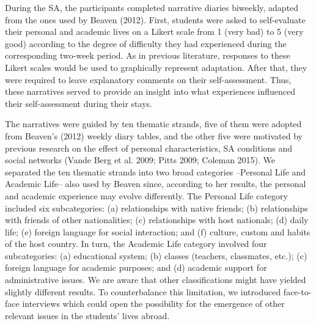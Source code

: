 \documentclass[12pt]{article}
\newenvironment{styleStandard}{\setlength\leftskip{0cm}\setlength\rightskip{0cm plus 1fil}\setlength\parindent{0cm}\setlength\parfillskip{0pt plus 1fil}\setlength\parskip{0in plus 1pt}\writerlistparindent\writerlistleftskip\leavevmode\normalfont\normalsize\writerlistlabel\ignorespaces}{\unskip\vspace{0.111in plus 0.0111in}\par}
\newcommand\writerlistleftskip{}
\newcommand\writerlistparindent{}
\newcommand\writerlistlabel{}
\begin{document}
\begin{styleStandard}
During the SA, the participants completed narrative diaries biweekly, adapted from the ones used by Beaven (2012). First, students were asked to self-evaluate their personal and academic lives on a Likert scale from 1 (very bad) to 5 (very good) according to the degree of difficulty they had experienced during the corresponding two-week period. As in previous literature, responses to these Likert scales would be used to graphically represent adaptation. After that, they were required to leave explanatory comments on their self-assessment. Thus, these narratives served to provide an insight into what experiences influenced their self-assessment during their stays. 
\end{styleStandard}

\begin{styleStandard}
The narratives were guided by ten thematic strands, five of them were adopted from Beaven’s (2012) weekly diary tables, and the other five were motivated by previous research on the effect of personal characteristics, SA conditions and social networks (Vande Berg et al. 2009; Pitts 2009; Coleman 2015). We separated the ten thematic strands into two broad categories –Personal Life and Academic Life– also used by Beaven since, according to her results, the personal and academic experience may evolve differently. The Personal Life category included six subcategories: (a) relationships with native friends; (b) relationships with friends of other nationalities; (c) relationships with host nationals; (d) daily life; (e) foreign language for social interaction; and (f) culture, custom and habits of the host country. In turn, the Academic Life category involved four subcategories: (a) educational system; (b) classes (teachers, classmates, etc.); (c) foreign language for academic purposes; and (d) academic support for administrative issues. We are aware that other classifications might have yielded slightly different results. To counterbalance this limitation, we introduced face-to-face interviews which could open the possibility for the emergence of other relevant issues in the students’ lives abroad.
\end{styleStandard}
\end{document}
